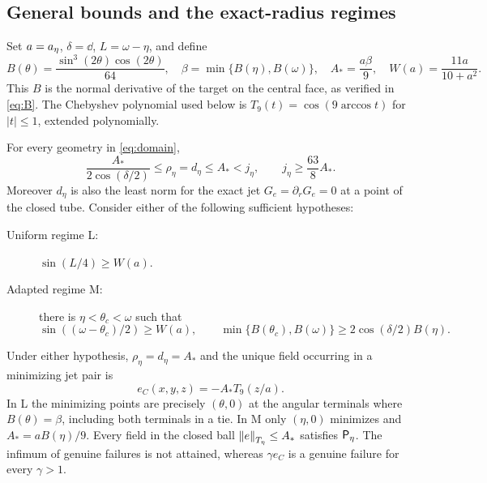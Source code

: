 \documentclass[11pt,a4paper]{article}
\begin{document}
\subsection{General bounds and the exact-radius regimes}
Set $a=a_\eta$, $\delta=\dd$, $L=\omega-\eta$, and define
\begin{equation}\label{eq:radiusdata}
 B(\theta)=\frac{\sin^3(2\theta)\cos(2\theta)}{64},\quad
 \beta=\min\{B(\eta),B(\omega)\},\quad
 A_*=\frac{a\beta}{9},\quad W(a)=\frac{11a}{10+a^2}.
\end{equation}
This $B$ is the normal derivative of the target on the central face,
as verified in \eqref{eq:B}. The Chebyshev polynomial used below is
$T_9(t)=\cos(9\arccos t)$ for $|t|\le1$, extended polynomially.

\begin{theorem}\label{thm:radius}
For every geometry in \eqref{eq:domain},
\begin{equation}\label{eq:universalradius}
 \frac{A_*}{2\cos(\delta/2)}\le
 \rho_\eta=d_\eta\le A_*<j_\eta,\qquad j_\eta\ge\frac{63}{8}A_*.
\end{equation}
Moreover $d_\eta$ is also the least norm for the exact jet
$G_e=\partial_rG_e=0$ at a point of the closed tube.
Consider either of the following sufficient hypotheses:
\begin{description}
\item[Uniform regime L:] $\sin(L/4)\ge W(a)$.
\item[Adapted regime M:] there is $\eta<\theta_c<\omega$ such that
\begin{equation}\label{eq:Msummary}
 \sin((\omega-\theta_c)/2)\ge W(a),\qquad
 \min\{B(\theta_c),B(\omega)\}\ge2\cos(\delta/2)B(\eta).
\end{equation}
\end{description}
Under either hypothesis, $\rho_\eta=d_\eta=A_*$ and the unique
field occurring in a minimizing jet pair is
\begin{equation}\label{eq:critical}
 e_C(x,y,z)=-A_*T_9(z/a).
\end{equation}
In L the minimizing points are precisely $(\theta,0)$ at the angular
terminals where $B(\theta)=\beta$, including both terminals in a tie.
In M only $(\eta,0)$ minimizes and $A_*=aB(\eta)/9$.
Every field in the closed ball $\left\lVert e\right\rVert_{T_\eta}\le A_*$ satisfies $\mathsf P_\eta$.
The infimum of genuine failures is not attained, whereas
$\gamma e_C$ is a genuine failure for every $\gamma>1$.
\end{theorem}
\end{document}
